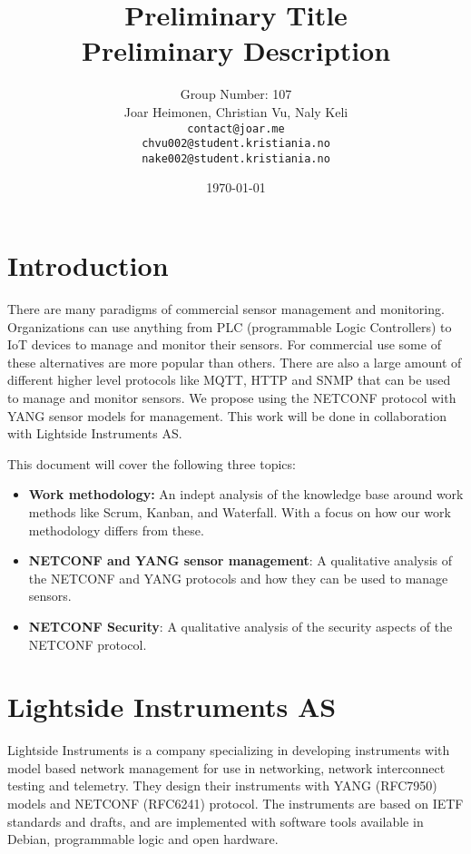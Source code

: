 \documentclass[12pt]{article}
\author{
    Group Number: 107\\
    Joar Heimonen, Christian Vu, Naly Keli \\
    \texttt{contact@joar.me}\\ 
    \texttt{chvu002@student.kristiania.no}\\
    \texttt{nake002@student.kristiania.no}
}
\title{
  \textbf{Preliminary Title}\\
  \large{Preliminary Description}
}
\date{\today}
\begin{document}
\maketitle
\pagebreak

\tableofcontents

\pagebreak


\section{Introduction}
There are many paradigms of commercial sensor management and monitoring. Organizations can use anything from 
PLC (programmable Logic Controllers) to IoT devices to manage and monitor their sensors. For commercial use 
some of these alternatives are more popular than others. There are also a large amount of different higher level protocols
like MQTT, HTTP and SNMP that can be used to manage and monitor sensors. We propose using the NETCONF protocol 
with YANG sensor models for management. This work will be done in collaboration with Lightside Instruments AS.

This document will cover the following three topics:
\begin{itemize}
  \item \textbf{Work methodology:} An indept analysis of the knowledge base around work methods like Scrum, Kanban, and Waterfall. 
  With a focus on how our work methodology differs from these.
  \item \textbf{NETCONF and YANG sensor management}: A qualitative analysis of the NETCONF and YANG protocols and how they can be used to manage sensors.
  \item \textbf{NETCONF Security}: A qualitative analysis of the security aspects of the NETCONF protocol.
\end{itemize}

\section{Lightside Instruments AS}
Lightside Instruments is a company specializing in developing instruments with model based network management 
for use in networking, network interconnect testing and telemetry. 
They design their instruments with YANG (RFC7950) models and NETCONF (RFC6241) \cite{ennsNetworkConfigurationProtocol2011} protocol. 
The instruments are based on IETF standards and drafts, 
and are implemented with software tools available in Debian, programmable 
logic and open hardware. \cite{lsi}
\end{document}
